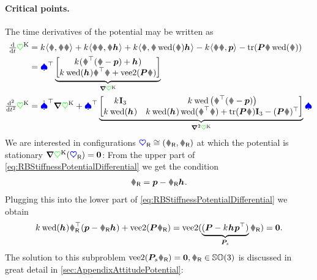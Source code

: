 \paragraph{Critical points.}
The time derivatives of the potential may be written as
\begin{align}\label{eq:RBStiffnessPotentialDifferential}
 \tdiff{t} \potentialStiff &= \bodyStiffness{}{} \sProd{\r}{\R\v} + \bodyStiffness{}{} \sProd{\R\v}{\R \bodyCOS{}{}} + \bodyStiffness{}{} \sProd{\r}{\R\wedOp(\w) \bodyCOS{}{}} - \bodyStiffness{}{} \sProd{\R\v}{\tuple{p}} - \tr(\mat{P} \R \wedOp(\w))
\nonumber\\
 &= \sysVel^\top \underbrace{\begin{bmatrix} \bodyStiffness{}{} (\R^\top (\r - \tuple{p}) + \bodyCOS{}{}) \\ \bodyStiffness{}{} \wedOp(\bodyCOS{}{}) \R^\top \r + \veeTwoOp(\mat{P} \R) \end{bmatrix}}_{\differential \potentialStiff}
\\
 \tfrac{\d^2}{\d t^2} \potentialStiff 
 &= \sysVeld^\top \differential \potentialStiff + \sysVel^\top \underbrace{\begin{bmatrix} \bodyStiffness{}{} \idMat[3] & \bodyStiffness{}{}\wedOp\big(\R^\top (\r - \tuple{p})\big) \\ \bodyStiffness{}{}\wedOp(\bodyCOS{}{}) & \bodyStiffness{}{} \wedOp(\bodyCOS{}{}) \wedOp(\R^\top \r) + \tr(\mat{P} \R)\idMat[3] - (\mat{P} \R)^\top \end{bmatrix}}_{\differential^2 \potentialStiff} \sysVel
\end{align}
We are interested in configurations $\sysCoordR\cong (\rR, \RR)$ at which the potential is stationary $\boldsymbol{\nabla} \textcolor{green}{\heartsuit}^{\mathrm{K}}(\boldsymbol{\textcolor{blue}{\heartsuit}}_{\mathsf{R}}) = \boldsymbol{0}$:
From the upper part of \eqref{eq:RBStiffnessPotentialDifferential} we get the condition
\begin{align}
 \rR = \tuple{p} - \RR \bodyCOS{}{}.
\end{align}
Plugging this into the lower part of \eqref{eq:RBStiffnessPotentialDifferential} we obtain
\begin{align}
 \bodyStiffness{}{} \wedOp(\bodyCOS{}{}) \RR^\top (\tuple{p} - \RR \bodyCOS{}{}) + \veeTwoOp(\mat{P} \RR)
 = \veeTwoOp(\underbrace{(\mat{P} - \bodyStiffness{}{}\bodyCOS{}{}\tuple{p}^\top)}_{\mat{P}_{\!s}} \RR ) = \tuple{0}.
\end{align}
The solution to this subproblem $\veeTwoOp(\mat{P}_{\!s} \RR) = \tuple{0}, \RR\in\SpecialOrthogonalGroup(3)$ is discussed in great detail in \autoref{sec:AppendixAttitudePotential}:
